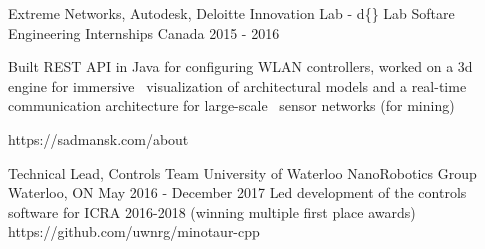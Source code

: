 \begin{cventries}

\cventrylink
{Extreme Networks, Autodesk, Deloitte Innovation Lab - d\{\} Lab}
{Softare Engineering Internships}
{Canada}
{2015 - 2016} %
{ %
\begin{cvitems}
\item {Built REST API in Java for configuring WLAN controllers, worked on a 3d engine for immersive \
    visualization of architectural models and a real-time communication architecture for large-scale \
    sensor networks (for mining)}
\end{cvitems}
}
{https://sadmansk.com/about}


\cventrylink
{Technical Lead, Controls Team}
{University of Waterloo NanoRobotics Group}
{Waterloo, ON}
{May 2016 - December 2017} %
{ %
    Led development of the controls software for ICRA 2016-2018 (winning multiple first place awards)
}
{https://github.com/uwnrg/minotaur-cpp}

\end{cventries}
